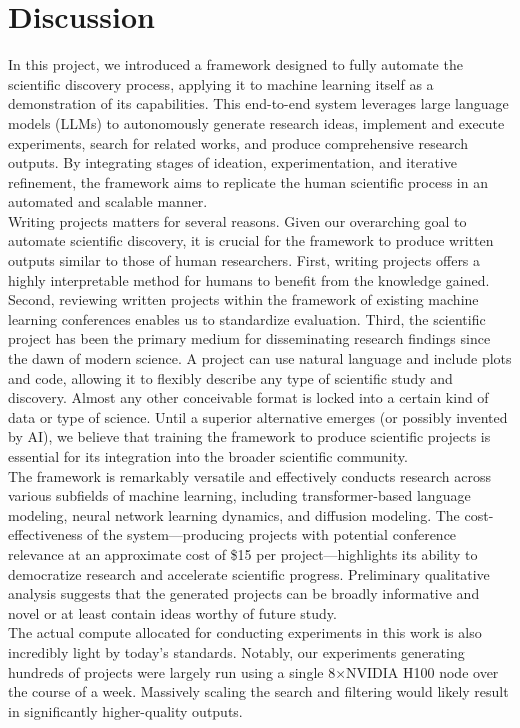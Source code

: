 \section{Discussion}
In this project, we introduced a framework designed to fully automate the scientific discovery process, applying it to machine learning itself as a demonstration of its capabilities. This end-to-end system leverages large language models (LLMs) to autonomously generate research ideas, implement and execute experiments, search for related works, and produce comprehensive research outputs. By integrating stages of ideation, experimentation, and iterative refinement, the framework aims to replicate the human scientific process in an automated and scalable manner.\\
Writing projects matters for several reasons. Given our overarching goal to automate scientific discovery, it is crucial for the framework to produce written outputs similar to those of human researchers. First, writing projects offers a highly interpretable method for humans to benefit from the knowledge gained. Second, reviewing written projects within the framework of existing machine learning conferences enables us to standardize evaluation. Third, the scientific project has been the primary medium for disseminating research findings since the dawn of modern science. A project can use natural language and include plots and code, allowing it to flexibly describe any type of scientific study and discovery. Almost any other conceivable format is locked into a certain kind of data or type of science. Until a superior alternative emerges (or possibly invented by AI), we believe that training the framework to produce scientific projects is essential for its integration into the broader scientific community.\\
The framework is remarkably versatile and effectively conducts research across various subfields of machine learning, including transformer-based language modeling, neural network learning dynamics, and diffusion modeling. The cost-effectiveness of the system—producing projects with potential conference relevance at an approximate cost of \$15 per project—highlights its ability to democratize research and accelerate scientific progress. Preliminary qualitative analysis suggests that the generated projects can be broadly informative and novel or at least contain ideas worthy of future study.\\
The actual compute allocated for conducting experiments in this work is also incredibly light by today’s standards. Notably, our experiments generating hundreds of projects were largely run using a single 8×NVIDIA H100 node over the course of a week. Massively scaling the search and filtering would likely result in significantly higher-quality outputs.
